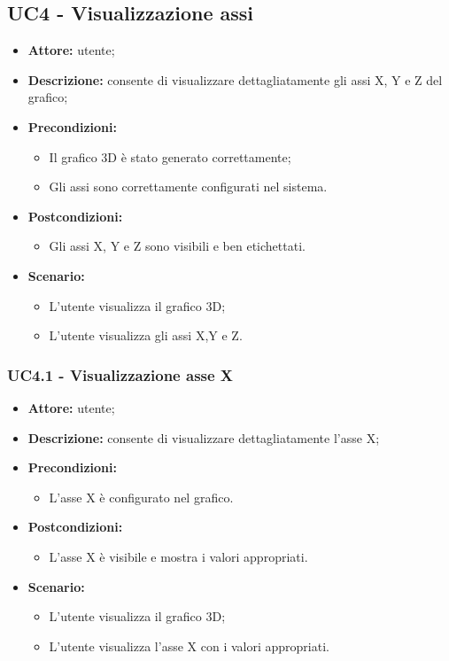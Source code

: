 \subsection{UC4 - Visualizzazione assi}
\begin{itemize}
    \item \textbf{Attore:} utente;
    \item \textbf{Descrizione:} consente di visualizzare dettagliatamente gli assi X, Y e Z del grafico;
    \item \textbf{Precondizioni:} 
    \begin{itemize}
        \item Il grafico 3D è stato generato correttamente;
        \item Gli assi sono correttamente configurati nel sistema.
    \end{itemize}
    \item \textbf{Postcondizioni:}
    \begin{itemize}
        \item Gli assi X, Y e Z sono visibili e ben etichettati.
    \end{itemize}
    \item \textbf{Scenario:}
    \begin{itemize}
        \item L'utente visualizza il grafico 3D;
        \item L'utente visualizza gli assi X,Y e Z.
    \end{itemize}

\end{itemize}
\subsubsection{UC4.1 - Visualizzazione asse X}
\begin{itemize}
    \item \textbf{Attore:} utente;
    \item \textbf{Descrizione:} consente di visualizzare dettagliatamente l'asse X;
    \item \textbf{Precondizioni:} 
    \begin{itemize}
        \item L'asse X è configurato nel grafico.
    \end{itemize}
    \item \textbf{Postcondizioni:} 
    \begin{itemize}
        \item L'asse X è visibile e mostra i valori appropriati.
    \end{itemize}
    \item \textbf{Scenario:} 
    \begin{itemize}
        \item L'utente visualizza il grafico 3D;
        \item L'utente visualizza l'asse X con i valori appropriati.
    \end{itemize}
\end{itemize}
